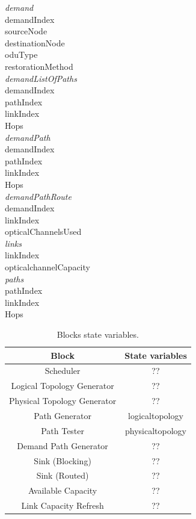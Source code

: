 \textit{demand}\\
demandIndex \\
sourceNode \\
destinationNode \\
oduType \\
restorationMethod \\

\textit{demandListOfPaths}\\
demandIndex \\
pathIndex \\
linkIndex \\
Hops \\

\textit{demandPath}\\
demandIndex \\
pathIndex \\
linkIndex \\
Hops \\

\textit{demandPathRoute}\\
demandIndex \\
linkIndex \\
opticalChannelsUsed \\

\textit{links} \\
linkIndex \\
opticalchannelCapacity \\

\textit{paths}\\
pathIndex \\
linkIndex \\
Hops \\

\begin{table}[H]
	\centering
	\begin{tabular}{| c | c |}
		\hline
		\textbf{Block} & \textbf{State variables} \\
		\hline
		Scheduler & ??  \\ \hline
		Logical Topology Generator & ?? \\ \hline
		Physical Topology Generator & ??\\ \hline
		Path Generator & logicaltopology  \\ \hline
		Path Tester & physicaltopology \\ \hline
		Demand Path Generator & ?? \\ \hline
		Sink (Blocking) & ?? \\ \hline
		Sink (Routed) & ?? \\ \hline
		Available Capacity & ?? \\ \hline
		Link Capacity Refresh & ??	\\ \hline
	\end{tabular}
	\caption{Blocks state variables.}
	\label{blocks_input}
\end{table}



